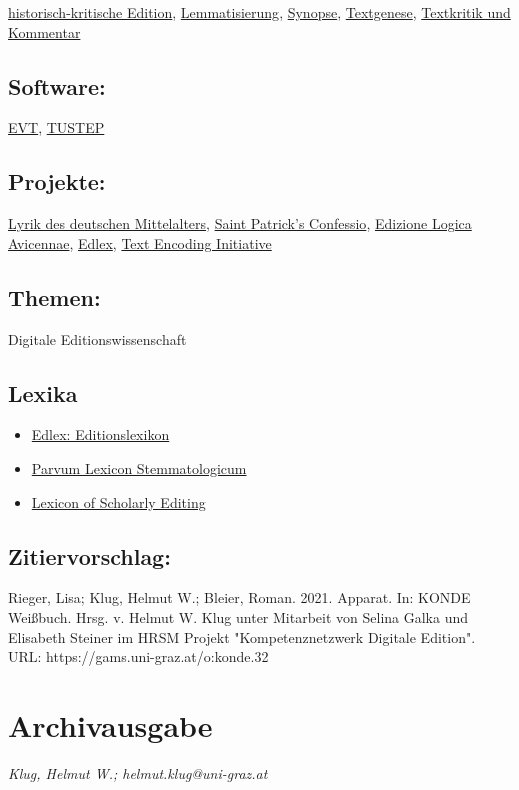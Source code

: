 \documentclass{article}
\begin{document}
\href{https://gams.uni-graz.at/o:konde.93}{historisch-kritische Edition}, \href{https://gams.uni-graz.at/o:konde.115}{Lemmatisierung}, \href{https://gams.uni-graz.at/o:konde.174}{Synopse}, \href{https://gams.uni-graz.at/o:konde.28}{Textgenese}, \href{https://gams.uni-graz.at/o:konde.192}{Textkritik und Kommentar}\subsection*{Software:}\href{http://evt.labcd.unipi.it/}{EVT}, \href{http://www.tustep.uni-tuebingen.de/}{TUSTEP}\subsection*{Projekte:}\href{http://www.ldm-digital.de}{Lyrik des deutschen Mittelalters}, \href{https://www.confessio.ie/etexts/confessio_latin#01}{Saint Patrick’s Confessio}, \href{http://evt.labcd.unipi.it/demo/evt2-beta2/avicenna/#/readingTxt?d=doc_1&p=C-112v&s=text-body-div&e=critical}{Edizione Logica Avicennae}, \href{https://edlex.de/}{Edlex}, \href{https://tei-c.org}{Text Encoding Initiative}\subsection*{Themen:}Digitale Editionswissenschaft\subsection*{Lexika}\begin{itemize}\item \href{https://edlex.de/index.php?title=Apparat}{Edlex: Editionslexikon}\item \href{https://wiki.helsinki.fi/display/stemmatology/Apparatus}{Parvum Lexicon Stemmatologicum}\item \href{https://lexiconse.uantwerpen.be/index.php/lexicon/critical-apparatus/}{Lexicon of Scholarly Editing}\end{itemize}\subsection*{Zitiervorschlag:}Rieger, Lisa; Klug, Helmut W.; Bleier, Roman. 2021. Apparat. In: KONDE Weißbuch. Hrsg. v. Helmut W. Klug unter Mitarbeit von Selina Galka und Elisabeth Steiner im HRSM Projekt "Kompetenznetzwerk Digitale Edition". URL: https://gams.uni-graz.at/o:konde.32\newpage\section*{Archivausgabe} \emph{Klug, Helmut W.; helmut.klug@uni-graz.at}\\
        
\end{document}
